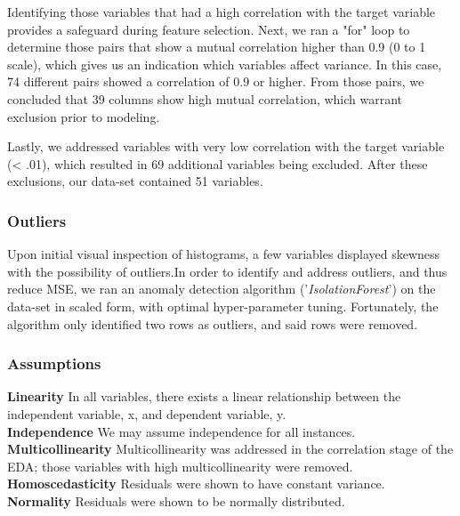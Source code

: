 \documentclass[twoside,twocolumn]{article}
\begin{document}
Identifying those variables that had a high correlation with the target variable provides a safeguard during feature selection. 
Next, we ran a "for" loop to determine those pairs that show a mutual correlation higher than 0.9 (0 to 1 scale), which gives us an indication which variables affect variance. In this case, 74 different pairs showed a correlation of 0.9 or higher. From those pairs, we concluded that 39 columns show high mutual correlation, which warrant exclusion prior to modeling. 

Lastly, we addressed variables with very low correlation with the target variable (< .01), which resulted in 69 additional variables being excluded. After these exclusions, our data-set contained 51 variables.

\subsubsection{Outliers}
Upon initial visual inspection of histograms, a few variables displayed skewness with the possibility of outliers.In order to identify and address outliers, and thus reduce MSE, we ran an anomaly detection algorithm ('\emph{IsolationForest}') on the data-set in scaled form, with optimal hyper-parameter tuning. Fortunately, the algorithm only identified two rows as outliers, and said rows were removed.

\subsubsection{Assumptions}
\textbf{Linearity}\newline
In all variables, there exists a linear relationship between the independent variable, x, and dependent variable, y.\newline
\\
\textbf{Independence}\newline
We may assume independence for all instances.\newline
\\
\textbf{Multicollinearity}\newline
Multicollinearity was addressed in the correlation stage of the EDA; those variables with high multicollinearity were removed.\newline
\\
\textbf{Homoscedasticity}\newline
Residuals were shown to have constant variance.\newline
\\
\textbf{Normality}\newline
Residuals were shown to be normally distributed.
\end{document}
